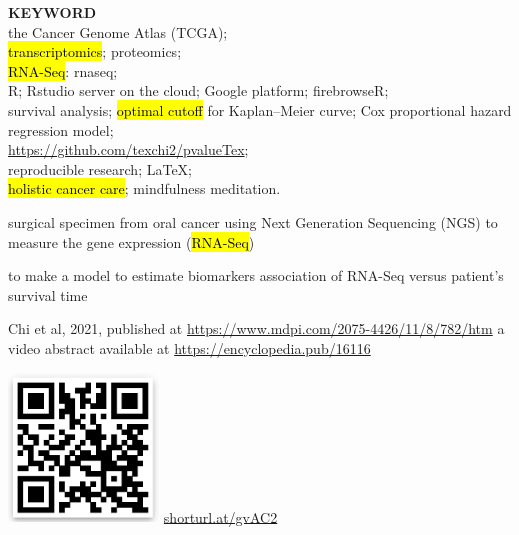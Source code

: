 \documentclass[
paper=landscape,
paper=160mm:90mm, %
fontsize=11pt, %
pagesize, %
parskip=half-, %
]{scrartcl} %
\theoremstyle{mythmstyle} %
\begin{document}
\thispagestyle{empty} %

\small\tableofcontents %


\textbf{KEYWORD}\\
the Cancer Genome Atlas (TCGA); \\
\hl{transcriptomics}; proteomics; \\
\hl{RNA-Seq}: \acrlong{rnaseq};\\ %
R; Rstudio server on the cloud; Google platform; firebrowseR;\\
survival analysis; \hl{optimal cutoff} for Kaplan--Meier curve; Cox proportional hazard regression model;\\
\url{https://github.com/texchi2/pvalueTex}; \\
reproducible research; \LaTeX;\\
\hl{holistic cancer care}; mindfulness meditation.

\begin{outline}

\1 surgical specimen from oral cancer %
\2 using Next Generation Sequencing (NGS) to measure the gene expression (\hl{RNA-Seq})

\1 to make a model to estimate biomarkers
\2 association of RNA-Seq versus patient's survival time %

\1 Chi et al, 2021, published at \url{https://www.mdpi.com/2075-4426/11/8/782/htm}
\2 a video abstract available at
\url{https://encyclopedia.pub/16116}

\end{outline}
\includegraphics[width=4cm]{20220406.png} \url{shorturl.at/gvAC2}
\clearpage
\end{document}
